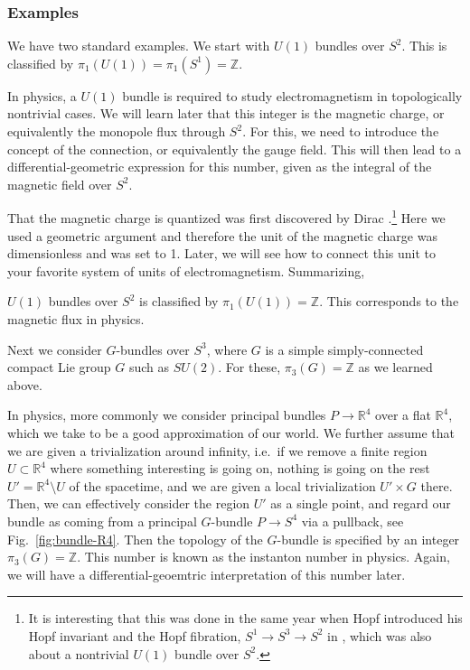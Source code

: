\documentclass[12pt]{article}
\numberwithin{equation}{section}
\numberwithin{figure}{section}
\theoremstyle{remark}
\def\bR{\mathbb{R}}
\def\bZ{\mathbb{Z}}
\begin{document}
\subsubsection{Examples}

We have two standard examples. We start with 
$U(1)$ bundles over $S^2$.
This is classified by $\pi_1(U(1))=\pi_1(S^1)=\bZ$.

In physics, a $U(1)$ bundle is required to study electromagnetism
in topologically nontrivial cases.
We will learn later that this integer is the magnetic charge,
or equivalently the monopole flux through $S^2$.
For this, we need to introduce the concept of the connection, 
or equivalently the gauge field.
This will then lead to a differential-geometric expression for this number,
given as the integral of the magnetic field over $S^2$.

That the magnetic charge is quantized was first discovered by Dirac \cite{Dirac}.\footnote{%
It is interesting that this was done in the same year when Hopf introduced
his Hopf invariant and the Hopf fibration, $S^1\to S^3\to S^2$ in \cite{Hopf},
which was also about a nontrivial $U(1)$ bundle over $S^2$.}
Here we used a geometric argument and therefore the unit of the magnetic charge was dimensionless and was set to 1.
Later, we will see how to connect this unit to your favorite system of units of electromagnetism.
Summarizing, 
\begin{example}
$U(1)$ bundles over $S^2$ is classified by $\pi_1(U(1))=\bZ$.
This corresponds to the magnetic flux in physics.
\end{example}


Next we consider $G$-bundles over $S^3$,
where $G$ is a simple simply-connected compact Lie group $G$ such as $SU(2)$.
For these, $\pi_3(G)=\bZ$  as we learned above.

In physics,  more commonly we consider  principal bundles $P\to \bR^4$ over a flat $\bR^4$,
which we take to be a good approximation of our world.
We further assume that we are given a trivialization around infinity,
i.e.~if we remove a finite region $U\subset \bR^4$ 
where something interesting is going on,
nothing is going on the rest $U'=\bR^4 \setminus U$ of the spacetime,
and we are given a local trivialization $U'\times G$ there.
Then, we can effectively consider the region $U'$ as a single point,
and regard our bundle as coming from a principal $G$-bundle  $P\to S^4$
via a pullback, see Fig.~\ref{fig:bundle-R4}.
Then the topology of the $G$-bundle is specified by an integer $\pi_3(G)=\bZ$.
This number is known as the instanton number in physics.
Again, we will have a differential-geoemtric interpretation of this number later.
\end{document}
